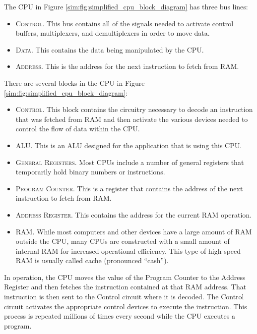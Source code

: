 The \ac{CPU} in Figure \ref{sim:fig:simplified_cpu_block_diagram} has three bus lines: 

\begin{itemize}
  \item \textsc{Control}. This bus contains all of the signals needed to activate control buffers, multiplexers, and demultiplexers in order to move data.
  \item \textsc{Data}. This contains the data being manipulated by the \ac{CPU}.
  \item \textsc{Address}. This is the address for the next instruction to fetch from \ac{RAM}.
\end{itemize}

There are several blocks in the \ac{CPU} in Figure \ref{sim:fig:simplified_cpu_block_diagram}:

\begin{itemize}
  \item \textsc{Control}. This block contains the circuitry necessary to decode an instruction that was fetched from \ac{RAM} and then activate the various devices needed to control the flow of data within the \ac{CPU}.
  \item \textsc{\ac{ALU}}. This is an \acl{ALU} designed for the application that is using this \ac{CPU}.
  \item \textsc{General Registers}. Most \acp{CPU} include a number of general registers that temporarily hold binary numbers or instructions.
  \item \textsc{Program Counter}. This is a register that contains the address of the next instruction to fetch from \ac{RAM}.
  \item \textsc{Address Register}. This contains the address for the current \ac{RAM} operation.
  \item \textsc{\ac{RAM}}. While most computers and other devices have a large amount of \ac{RAM} outside the \ac{CPU}, many \acp{CPU} are constructed with a small amount of internal \ac{RAM} for increased operational efficiency. This type of high-speed \ac{RAM} is usually called cache (pronounced ``cash'').
\end{itemize}

In operation, the \ac{CPU} moves the value of the Program Counter to the Address Register and then fetches the instruction contained at that \ac{RAM} address. That instruction is then sent to the Control circuit where it is decoded. The Control circuit activates the appropriate control devices to execute the instruction. This process is repeated millions of times every second while the \ac{CPU} executes a program.


